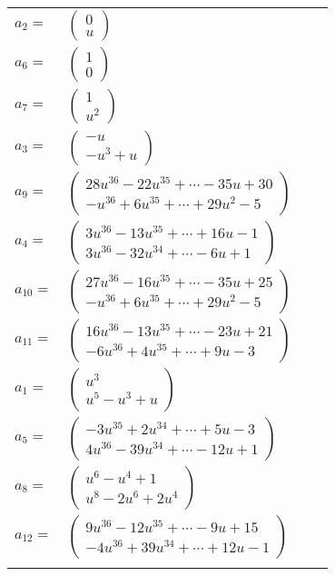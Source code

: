 \documentclass[1p]{elsarticle_modified}
\theoremstyle{definition}
\begin{document}
\begin{tabular}{m{7pt} m{180pt} m{7pt} m{180pt} }
\flushright $a_{2}=$&$\begin{pmatrix}0\\u\end{pmatrix}$ \\
\flushright $a_{6}=$&$\begin{pmatrix}1\\0\end{pmatrix}$ \\
\flushright $a_{7}=$&$\begin{pmatrix}1\\u^2\end{pmatrix}$ \\
\flushright $a_{3}=$&$\begin{pmatrix}- u\\- u^3+u\end{pmatrix}$ \\
\flushright $a_{9}=$&$\begin{pmatrix}28 u^{36}-22 u^{35}+\cdots-35 u+30\\- u^{36}+6 u^{35}+\cdots+29 u^2-5\end{pmatrix}$ \\
\flushright $a_{4}=$&$\begin{pmatrix}3 u^{36}-13 u^{35}+\cdots+16 u-1\\3 u^{36}-32 u^{34}+\cdots-6 u+1\end{pmatrix}$ \\
\flushright $a_{10}=$&$\begin{pmatrix}27 u^{36}-16 u^{35}+\cdots-35 u+25\\- u^{36}+6 u^{35}+\cdots+29 u^2-5\end{pmatrix}$ \\
\flushright $a_{11}=$&$\begin{pmatrix}16 u^{36}-13 u^{35}+\cdots-23 u+21\\-6 u^{36}+4 u^{35}+\cdots+9 u-3\end{pmatrix}$ \\
\flushright $a_{1}=$&$\begin{pmatrix}u^3\\u^5- u^3+u\end{pmatrix}$ \\
\flushright $a_{5}=$&$\begin{pmatrix}-3 u^{35}+2 u^{34}+\cdots+5 u-3\\4 u^{36}-39 u^{34}+\cdots-12 u+1\end{pmatrix}$ \\
\flushright $a_{8}=$&$\begin{pmatrix}u^6- u^4+1\\u^8-2 u^6+2 u^4\end{pmatrix}$ \\
\flushright $a_{12}=$&$\begin{pmatrix}9 u^{36}-12 u^{35}+\cdots-9 u+15\\-4 u^{36}+39 u^{34}+\cdots+12 u-1\end{pmatrix}$\\&\end{tabular}
\end{document}
